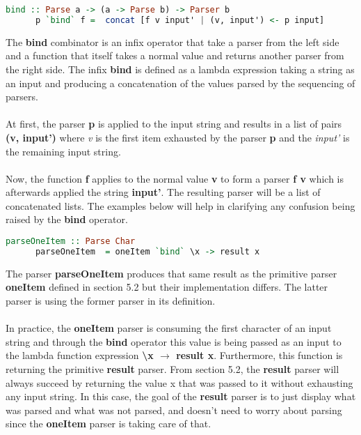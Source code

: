\documentclass[a4paper, onecolumn]{article}
\begin{document}
    \begin{tcolorbox}
    
    \begin{lstlisting}[language=Haskell]
      bind :: Parse a -> (a -> Parse b) -> Parser b
      p `bind` f =  concat [f v input' | (v, input') <- p input]
    \end{lstlisting}
    \end{tcolorbox}
    
    The \textbf{bind} combinator is an infix operator that take a parser from the left side and a function that itself takes a normal value and returns another parser from the right side. The infix \textbf{bind} is defined as a lambda expression taking a string as an input and producing a concatenation of the values parsed by the sequencing of parsers. \\ \\
    At first, the parser \textbf{p} is applied to the input string and results in a list of pairs \textbf{(v, input')} where \textit{v} is the first item exhausted by the parser \textbf{p} and the \textit{input'} is the remaining input string. \\ \\
    Now, the function \textbf{f} applies to the normal value \textbf{v} to form a parser \textbf{f v} which is afterwards applied the string \textbf{input'}. The resulting parser will be a list of concatenated lists. The examples below will help in clarifying any confusion being raised by the \textbf{bind} operator. 
    
    \begin{tcolorbox}
    \begin{lstlisting}[language=Haskell]
      parseOneItem :: Parse Char
      parseOneItem  = oneItem `bind` \x -> result x 
    \end{lstlisting}
    \end{tcolorbox}
    
    The parser \textbf{parseOneItem} produces that same result as the primitive parser \textbf{oneItem} defined in section 5.2 but their implementation differs. The latter parser is using the former parser in its definition. \\ \\ 
    In practice, the \textbf{oneItem} parser is consuming the first character of an input string and through the \textbf{bind} operator this value is being passed as an input to the lambda function expression \textbf{\textbackslash x $\rightarrow$ result x}. Furthermore, this function is returning the primitive \textbf{result} parser. From section 5.2, the \textbf{result} parser will always succeed by returning the value x that was passed to it without exhausting any input string. In this case, the goal of the \textbf{result} parser is to just display what was parsed and what was not parsed, and doesn't need to worry about parsing since the \textbf{oneItem} parser is taking care of that.  
    
\end{document}
